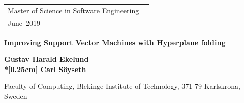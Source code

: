 \documentclass[a4paper,twoside]{bth}
\newcommand{\thesisDegree}{Master of Science in Software Engineering}
\newcommand{\thesisMonth}{June}
\newcommand{\thesisYear}{2019}
\newcommand{\faculty}{Computing}
\newcommand{\thesisTitle}{Improving Support Vector Machines with Hyperplane folding}
\newcommand{\thesisSubtitle}{}
\newcommand{\authorFirst}{Gustav Harald Ekelund}
\newcommand{\authorSecond}{Carl Söyseth}
\begin{document}
\pagestyle{plain}

{\pagestyle{empty}
\changepage{3cm}{1cm}{-0.5cm}{-0.5cm}{}{-1.5cm}{}{}{}
\noindent
\begin{tabular}{@{}p{} p{}}
\thesisDegree & \hfill\multirow{3}{*}{\bthcsnotextlogo{3cm}} \\
\thesisMonth \ \thesisYear & \\
\end{tabular}

\center

\vspace {7.5cm}

{\Huge\textbf{\thesisTitle}}

\vspace {0.5cm}

{\Large\textbf{\thesisSubtitle}}

\vspace {2cm}

{\Large\textbf{\authorFirst \\*[0.25cm] \authorSecond}}

\vspace*{\fill}

\noindent\makebox[\linewidth]{\rule{\textwidth}{1pt}} 
Faculty of \faculty, Blekinge Institute of Technology, 371 79 Karlskrona, Sweden

\clearpage
} %
\end{document}
